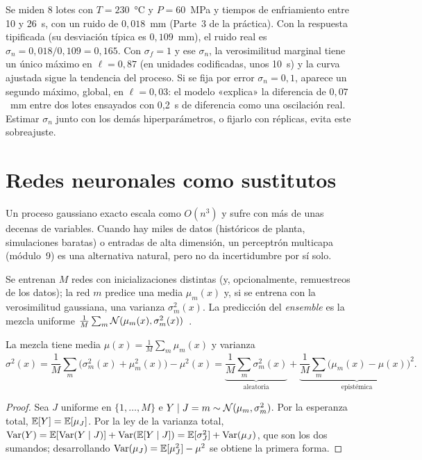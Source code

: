 \begin{ejemplo}\label{ej:lml}
Se miden 8 lotes con $T=230$~°C y $P=60$~MPa y tiempos de enfriamiento entre 10 y 26~s, con un ruido de $0{,}018$~mm (Parte~3 de la práctica). Con la respuesta tipificada (su desviación típica es $0{,}109$~mm), el ruido real es $\sigma_n=0{,}018/0{,}109=0{,}165$. Con $\sigma_f=1$ y ese $\sigma_n$, la verosimilitud marginal tiene un único máximo en $\ell=0{,}87$ (en unidades codificadas, unos 10~s) y la curva ajustada sigue la tendencia del proceso. Si se fija por error $\sigma_n=0{,}1$, aparece un segundo máximo, global, en $\ell=0{,}03$: el modelo «explica» la diferencia de $0{,}07$~mm entre dos lotes ensayados con 0,2~s de diferencia como una oscilación real. Estimar $\sigma_n$ junto con los demás hiperparámetros, o fijarlo con réplicas, evita este sobreajuste.
\end{ejemplo}

\section{Redes neuronales como sustitutos}

Un proceso gaussiano exacto escala como $O(n^3)$ y sufre con más de unas decenas de variables. Cuando hay miles de datos (históricos de planta, simulaciones baratas) o entradas de alta dimensión, un perceptrón multicapa (módulo~9) es una alternativa natural, pero no da incertidumbre por sí solo.

\begin{definicion}\label{def:ensemble}
Se entrenan $M$ redes con inicializaciones distintas (y, opcionalmente, remuestreos de los datos); la red $m$ predice una media $\mu_m(x)$ y, si se entrena con la verosimilitud gaussiana, una varianza $\sigma_m^2(x)$. La predicción del \emph{ensemble} es la mezcla uniforme $\frac1M\sum_m\mathcal{N}(\mu_m(x),\sigma_m^2(x))$~\cite{lakshmi}.
\end{definicion}

\begin{proposicion}\label{prop:mezcla}
La mezcla tiene media $\mu(x)=\frac1M\sum_m\mu_m(x)$ y varianza
\[
\sigma^2(x)=\frac1M\sum_m\bigl(\sigma_m^2(x)+\mu_m^2(x)\bigr)-\mu^2(x)=\underbrace{\frac1M\sum_m\sigma_m^2(x)}_{\text{aleatoria}}+\underbrace{\frac1M\sum_m\bigl(\mu_m(x)-\mu(x)\bigr)^2}_{\text{epistémica}} .
\]
\end{proposicion}

\begin{proof}
Sea $J$ uniforme en $\{1,\dots,M\}$ e $Y\mid J=m\sim\mathcal{N}(\mu_m,\sigma_m^2)$. Por la esperanza total, $\mathbb{E}[Y]=\mathbb{E}[\mu_J]$. Por la ley de la varianza total, $\operatorname{Var}(Y)=\mathbb{E}[\operatorname{Var}(Y\mid J)]+\operatorname{Var}(\mathbb{E}[Y\mid J])=\mathbb{E}[\sigma_J^2]+\operatorname{Var}(\mu_J)$, que son los dos sumandos; desarrollando $\operatorname{Var}(\mu_J)=\mathbb{E}[\mu_J^2]-\mu^2$ se obtiene la primera forma.
\end{proof}

